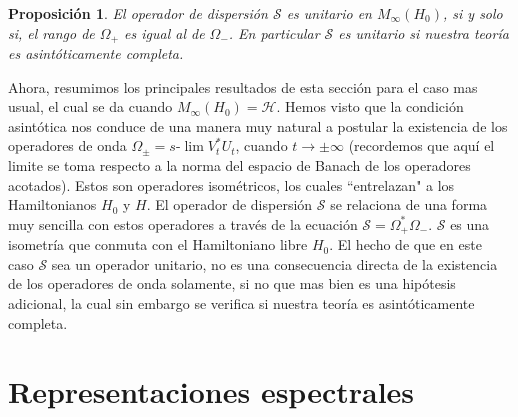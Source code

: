 \documentclass[12pt]{book}
\numberwithin{equation}{chapter}
\newtheorem{proposition}[theorem]{Proposici\'on}
\def\S{\mathcal{S}}
\def\rar{\rightarrow}
\def\H{\mathcal{H}}
\def\O{\Omega}
\def\slim{s\mbox{-}\lim}
\begin{document}
\begin{proposition}\label{prop-s-u}
El operador de dispersi\'on $\S$ es unitario en $M_{\infty}(H_{0})$, si y solo si, el rango de $\O_{+}$ es igual al de $\O_{-}$. En particular $\S$ es unitario si nuestra teor\'ia es asint\'oticamente completa. 
\end{proposition} 

\vspace{5 mm}

Ahora, resumimos los principales resultados de esta secci\'on para el caso mas usual, el cual se da cuando $M_{\infty}(H_{0})=\H$. Hemos visto que la condici\'on asint\'otica nos conduce de una manera muy natural a postular la existencia de los operadores de onda $\O_{\pm}= \slim V_{t}^{*}U_{t} $, cuando $t \rar \pm \infty$ (recordemos que aqu\'i el limite se toma respecto a la norma del espacio de Banach de los operadores acotados). Estos son operadores isom\'etricos, los cuales ``entrelazan" a los Hamiltonianos $H_{0}$ y $H$. El operador de dispersi\'on $\S$ se relaciona de una forma muy sencilla con estos operadores a trav\'es de la ecuaci\'on $\S= \O_{+}^{*}\O_{-} $. $\S$ es una isometr\'ia que conmuta con el Hamiltoniano libre $H_{0}$. El hecho de que en este caso $\S$ sea un operador unitario, no es una consecuencia directa de la existencia de los operadores de onda solamente, si no que mas bien es una hip\'otesis adicional, la cual sin embargo se verifica si nuestra teor\'ia es asint\'oticamente completa.


\chapter{Representaciones espectrales}
\end{document}
